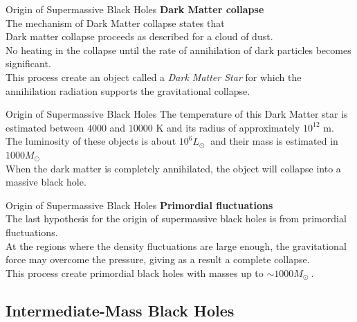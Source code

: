 \documentclass{beamer}
\begin{document}
\begin{frame}{Origin of Supermassive Black Holes}
	\textbf{Dark Matter collapse}\\

	The mechanism of Dark Matter collapse states that\\
	\pause
	\bigskip
	\onslide<2-> Dark matter collapse proceeds as described for a cloud of dust.\\ 
	\pause
	\bigskip
	\onslide<3-> No heating in the collapse until the rate of annihilation of dark particles becomes significant.\\ 
	\pause
	\bigskip
	\onslide<4-> This process create an object called a \textit{Dark Matter Star} for which the annihilation radiation supports the gravitational collapse.
\end{frame}

\begin{frame}{Origin of Supermassive Black Holes}
	\onslide<1-> The temperature of this Dark Matter star is estimated between $4000$ and $10000$ \si{K} and its radius of approximately $10^{12}$ \si{m}.\\
	\pause
	\bigskip
	\onslide<2-> The luminosity of these objects is about $10^6 L_\odot\ $ and their mass is estimated in $1000 M_\odot\ $\\ 
	\pause
	\bigskip
	\onslide<3-> When the dark matter is completely annihilated, the object will collapse into a massive black hole.
\end{frame}

\begin{frame}{Origin of Supermassive Black Holes}
	\textbf{Primordial fluctuations}\\
	
	\onslide<1-> The last hypothesis for the origin of supermassive black holes is from primordial fluctuations.\\
	\pause
	\bigskip
	\onslide<2-> At the regions where the density fluctuations are large enough, the gravitational force may overcome the pressure, giving as a result a complete collapse.\\ 
	\pause
	\bigskip
	\onslide<3-> This process create primordial black holes with masses up to $\sim 1000 M_\odot\ $. \\
\end{frame}


\subsection{Intermediate-Mass Black Holes}
\end{document}
